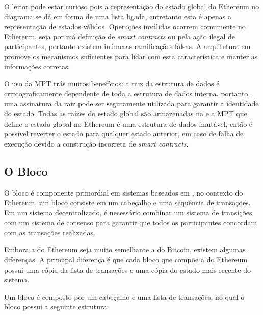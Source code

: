 \documentclass[tcc,capa]{texufpel}
\begin{document}
    O leitor pode estar curioso pois a representação do estado global do Ethereum no diagrama se dá em forma de uma lista ligada, entretanto esta é apenas a representação de estados válidos. Operações inválidas ocorrem comumente no Ethereum, seja por má definição de \textit{smart contracts} ou pela ação ilegal de participantes, portanto existem inúmeras ramificações falsas. A arquitetura em \bchain promove os mecanismos suficientes para lidar com esta característica e manter as informações corretas.

	O uso da MPT trás muitos benefícios: a raiz da estrutura de dados é criptograficamente dependente de toda a estrutura de dados interna, portanto, uma assinatura da raiz pode ser seguramente utilizada para garantir a identidade do estado. Todas as raízes do estado global são armazenadas na \bchain e a MPT que define o estado global no Ethereum é uma estrutura de dados imutável, então é possível reverter o estado para qualquer estado anterior, em caso de falha de execução devido a construção incorreta de \textit{smart contracts}.
	
	
	\subsection{O Bloco}
	
	O bloco é componente primordial em sistemas baseados em \bchain, no contexto do Ethereum, um bloco consiste em um cabeçalho e uma sequência de transações. Em um sistema decentralizado, é necessário combinar um sistema de transições com um sistema de consenso para garantir que todos os participantes concordam com as transações realizadas.
	
	Embora a \bchain do Ethereum seja muito semelhante a \bchain do Bitcoin, existem algumas diferenças. A principal diferença é que cada bloco que compõe a \bchain do Ethereum possui uma cópia da lista de transações e uma cópia do estado mais recente do sistema.
	
	Um bloco é composto por um cabeçalho e uma lista de transações, no qual o bloco possui a seguinte estrutura:
	
\end{document}
